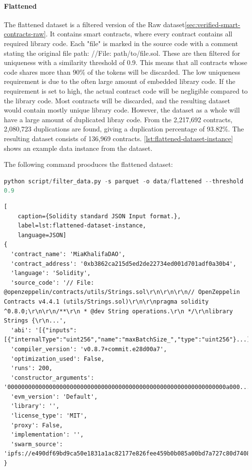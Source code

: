 
\paragraph{Flattened}
\label{sec:verified-smart-contracts-flattened}

The flattened dataset is a filtered version  of the Raw dataset\cref{sec:verified-smart-contracts-raw}. It contains smart contracts, where every contract contains all required library code. Each "file" is marked in the source code with a comment stating the original file path: //File: path/to/file.sol. These are then filtered for uniqueness with a similarity threshold of 0.9. This means that all contracts whose code shares more than 90\% of the tokens will be discarded. The low uniqueness requirement is due to the often large amount of embedded library code. If the requirement is set to high, the actual contract code will be negligible compared to the library code. Most contracts will be discarded, and the resulting dataset would contain mostly unique library code. However, the dataset as a whole will have a large amount of duplicated libray code. From the 2,217,692 contracts, 2,080,723 duplications are found, giving a duplication percentage of 93.82\%. The resulting dataset consists of 136,969 contracts. \cref{lst:flattened-dataset-instance} shows an example data instance from the dataset.


The following command prooduces the flattened dataset:

\lstinline[language=Python]!python script/filter_data.py -s parquet -o data/flattened --threshold 0.9!


\begin{lstlisting}[
    caption={Solidity standard JSON Input format.},
    label=lst:flattened-dataset-instance,
    language=JSON]
{
  'contract_name': 'MiaKhalifaDAO',
  'contract_address': '0xb3862ca215d5ed2de22734ed001d701adf0a30b4',
  'language': 'Solidity',
  'source_code': '// File: @openzeppelin/contracts/utils/Strings.sol\r\n\r\n\r\n// OpenZeppelin Contracts v4.4.1 (utils/Strings.sol)\r\n\r\npragma solidity ^0.8.0;\r\n\r\n/**\r\n * @dev String operations.\r\n */\r\nlibrary Strings {\r\n...',
  'abi': '[{"inputs":[{"internalType":"uint256","name":"maxBatchSize_","type":"uint256"}...]',
  'compiler_version': 'v0.8.7+commit.e28d00a7',
  'optimization_used': False,
  'runs': 200,
  'constructor_arguments': '000000000000000000000000000000000000000000000000000000000000000a000...',
  'evm_version': 'Default',
  'library': '',
  'license_type': 'MIT',
  'proxy': False,
  'implementation': '',
  'swarm_source': 'ipfs://e490df69bd9ca50e1831a1ac82177e826fee459b0b085a00bd7a727c80d74089'
}
\end{lstlisting}

